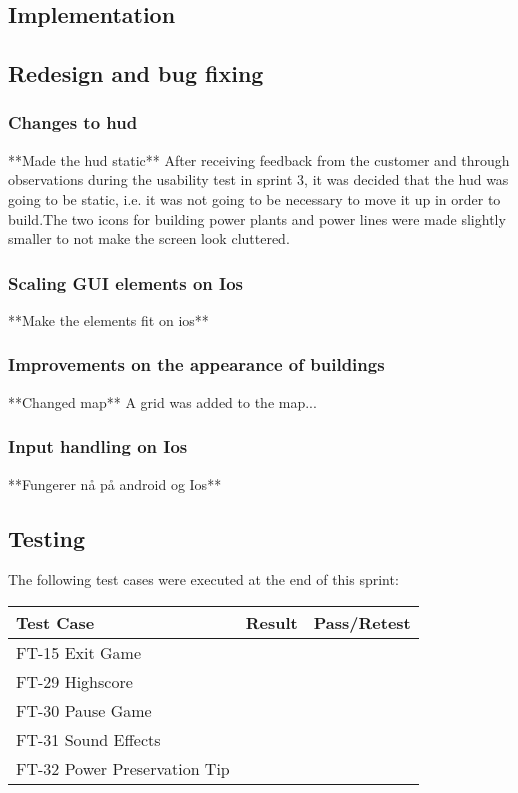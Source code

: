 \subsection{Implementation}

\subsection{Redesign and bug fixing}
	
	\subsubsection*{Changes to hud}
		**Made the hud static**
		After receiving feedback from the customer and through observations during the usability test in sprint 3, it was decided that the hud was going to be static, i.e. it was not going to be necessary to move it up in order to build.The two icons for building power plants and power lines were made slightly smaller to not make the screen look cluttered.
	\subsubsection*{Scaling GUI elements on Ios}
		**Make the elements fit on ios**
	\subsubsection*{Improvements on the appearance of buildings}
		**Changed map**
		A grid was added to the map...
	\subsubsection*{Input handling on Ios}
		**Fungerer nå på android og Ios**

\subsection{Testing}

	The following test cases were executed at the end of this sprint:


	\begin{tabular}{| p{3cm} | p{7cm} | p{2cm} |}
		\hline
		\rowcolor{lightgray}
		{\bf Test Case} & {\bf Result} & {\bf Pass/Retest} \\ \hline
		FT-15 Exit Game &  & \\ \hline
		FT-29 Highscore &  & \\ \hline
		FT-30 Pause Game &  & \\ \hline
		FT-31 Sound Effects &  & \\ \hline
		FT-32 Power Preservation Tip &  & \\ \hline
	\end{tabular}

